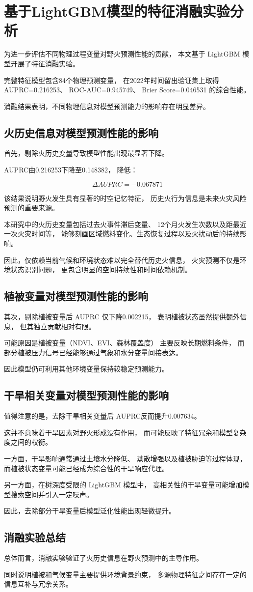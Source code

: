 \section{基于LightGBM模型的特征消融实验分析}

为进一步评估不同物理过程变量对野火预测性能的贡献，
本文基于 LightGBM 模型开展了特征消融实验。

完整特征模型包含84个物理预测变量，
在2022年时间留出验证集上取得
AUPRC=0.216253、
ROC-AUC=0.945749、
Brier Score=0.046531
的综合性能。

消融结果表明，不同物理信息对模型预测能力的影响存在明显差异。


\subsection{火历史信息对模型预测性能的影响}

首先，剔除火历史变量导致模型性能出现最显著下降。

AUPRC由0.216253下降至0.148382，
降低：

\[
\Delta AUPRC=-0.067871
\]

该结果说明野火发生具有显著的时空记忆特征，
历史火行为信息是未来火灾风险预测的重要来源。

本研究中的火历史变量包括过去火事件滞后变量、
12个月火发生次数以及距最近一次火灾时间等，
能够刻画区域燃料变化、生态恢复过程以及火扰动后的持续影响。

因此，仅依赖当前气候和环境状态难以完全替代历史火信息，
火灾预测不仅是环境状态识别问题，
更包含明显的空间持续性和时间依赖机制。


\subsection{植被变量对模型预测性能的影响}

其次，剔除植被变量后 AUPRC 仅下降0.002215，
表明植被状态虽然提供额外信息，
但其独立贡献相对有限。

可能原因是植被变量（NDVI、EVI、森林覆盖度）
主要反映长期燃料条件，
而部分植被压力信号已经能够通过气象和水分变量间接表达。

因此模型仍可利用其他环境变量保持较稳定预测能力。


\subsection{干旱相关变量对模型预测性能的影响}

值得注意的是，去除干旱相关变量后
AUPRC反而提升0.007634。

这并不意味着干旱因素对野火形成没有作用，
而可能反映了特征冗余和模型复杂度之间的权衡。

一方面，干旱影响通常通过土壤水分降低、
蒸散增强以及植被胁迫等过程体现，
而植被状态变量可能已经成为综合性的干旱响应代理。

另一方面，在树深度受限的 LightGBM 模型中，
高相关性的干旱变量可能增加模型搜索空间并引入一定噪声。

因此，去除部分干旱变量后模型泛化性能出现轻微提升。


\subsection{消融实验总结}

总体而言，消融实验验证了火历史信息在野火预测中的主导作用。

同时说明植被和气候变量主要提供环境背景约束，
多源物理特征之间存在一定的信息互补与冗余关系。
